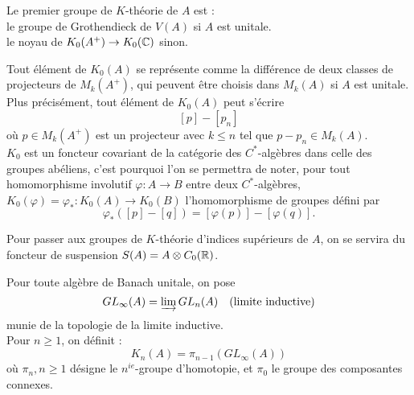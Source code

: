 \begin{definition}
Le premier groupe de $K$-théorie de $A$ est :\\
le groupe de Grothendieck de $V(A)$ si $A$ est unitale.\\
le noyau de $K_0(A^+)\rightarrow K_0(\mathbb C)$ sinon.
\end{definition}

Tout élément de $K_0(A)$ se représente comme la différence de deux classes de projecteurs de $M_k(A^+)$, qui peuvent être choisis dans $M_k(A)$ si $A$ est unitale. Plus précisément, tout élément de $K_0(A)$ peut s'écrire
\[[p]-[p_n]\]
où $p\in M_k(A^+)$ est un projecteur avec $k\leq n$ tel que $p-p_n \in M_k(A)$.\\

$K_0$ est un foncteur covariant de la catégorie des $C^*$-algèbres dans celle des groupes abéliens, c'est pourquoi l'on se permettra de noter, pour tout homomorphisme involutif $\varphi : A \rightarrow B$ entre deux $C^*$-algèbres, $K_0(\varphi)=\varphi_* : K_0(A)\rightarrow K_0(B)$ l'homomorphisme de groupes défini par 
\[\varphi_*([p]-[q])=[\varphi(p)]-[\varphi(q)].\]

Pour passer aux groupes de $K$-théorie d'indices supérieurs de $A$, on se servira du foncteur de suspension $S(A)=A\otimes C_0(\mathbb R)$.

\begin{definition}
Pour toute algèbre de Banach unitale, on pose \[GL_\infty(A) = \varinjlim GL_n(A) \quad \text{(limite inductive)}\]
munie de la topologie de la limite inductive.\\
Pour $n\geq 1$, on définit :
\[K_n(A)=\pi_{n-1}\left(GL_\infty (A)\right)\] 
où $\pi_n, n\geq 1$ désigne le $n^{ie}$-groupe d'homotopie, et $\pi_0$ le groupe des composantes connexes.
\end{definition}


